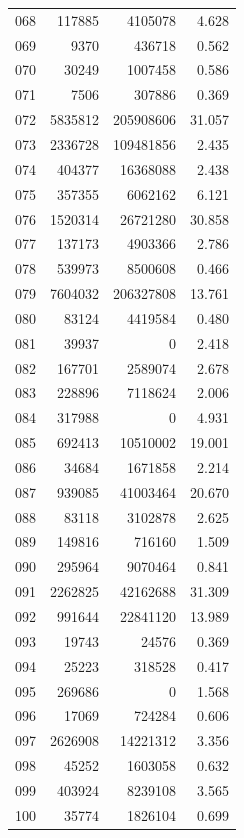 \documentclass[anonymous,notoc]{gmcm2026}
\begin{document}
\begin{longtable}{lrrr}
068 & 117885 & 4105078 & 4.628 \\
069 & 9370 & 436718 & 0.562 \\
070 & 30249 & 1007458 & 0.586 \\
071 & 7506 & 307886 & 0.369 \\
072 & 5835812 & 205908606 & 31.057 \\
073 & 2336728 & 109481856 & 2.435 \\
074 & 404377 & 16368088 & 2.438 \\
075 & 357355 & 6062162 & 6.121 \\
076 & 1520314 & 26721280 & 30.858 \\
077 & 137173 & 4903366 & 2.786 \\
078 & 539973 & 8500608 & 0.466 \\
079 & 7604032 & 206327808 & 13.761 \\
080 & 83124 & 4419584 & 0.480 \\
081 & 39937 & 0 & 2.418 \\
082 & 167701 & 2589074 & 2.678 \\
083 & 228896 & 7118624 & 2.006 \\
084 & 317988 & 0 & 4.931 \\
085 & 692413 & 10510002 & 19.001 \\
086 & 34684 & 1671858 & 2.214 \\
087 & 939085 & 41003464 & 20.670 \\
088 & 83118 & 3102878 & 2.625 \\
089 & 149816 & 716160 & 1.509 \\
090 & 295964 & 9070464 & 0.841 \\
091 & 2262825 & 42162688 & 31.309 \\
092 & 991644 & 22841120 & 13.989 \\
093 & 19743 & 24576 & 0.369 \\
094 & 25223 & 318528 & 0.417 \\
095 & 269686 & 0 & 1.568 \\
096 & 17069 & 724284 & 0.606 \\
097 & 2626908 & 14221312 & 3.356 \\
098 & 45252 & 1603058 & 0.632 \\
099 & 403924 & 8239108 & 3.565 \\
100 & 35774 & 1826104 & 0.699 \\
\end{longtable}
\end{document}

